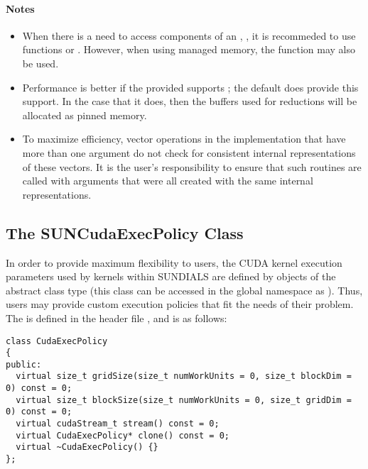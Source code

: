 \paragraph{\bf Notes}

\begin{itemize}

\item
  When there is a need to access components of an , ,
  it is recommeded to use functions  or
  . However, when using managed memory, the
  function  may also be used.

\item
  Performance is better if the  provided supports ;
  the default  does provide this support. In the case that it does,
  then the buffers used for reductions will be allocated as pinned memory.

\item
  {\warn}To maximize efficiency, vector operations in the {\nveccuda} implementation
  that have more than one  argument do not check for
  consistent internal representations of these vectors. It is the user's
  responsibility to ensure that such routines are called with 
  arguments that were all created with the same internal representations.

\end{itemize}

\subsection{The SUNCudaExecPolicy Class}\label{ss:suncudaexecpolicy}

In order to provide maximum flexibility to users, the CUDA kernel execution parameters used
by kernels within SUNDIALS are defined by objects of the 
abstract class type (this class can be accessed in the global namespace as ).
Thus, users may provide custom execution policies that fit the needs of their problem. The
 is defined in the header file ,
and is as follows:

\begin{verbatim}
class CudaExecPolicy
{
public:
  virtual size_t gridSize(size_t numWorkUnits = 0, size_t blockDim = 0) const = 0;
  virtual size_t blockSize(size_t numWorkUnits = 0, size_t gridDim = 0) const = 0;
  virtual cudaStream_t stream() const = 0;
  virtual CudaExecPolicy* clone() const = 0;
  virtual ~CudaExecPolicy() {}
};
\end{verbatim}

